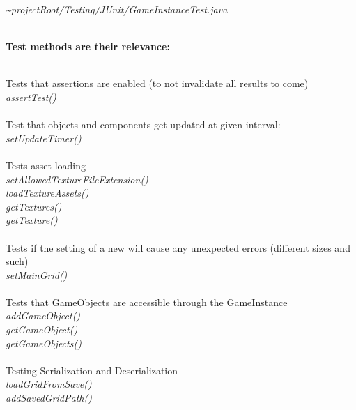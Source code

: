 \documentclass[]{article}
\begin{document}
\emph{\textasciitilde{}projectRoot/Testing/JUnit/GameInstanceTest.java}
\\ \\
\begin{large}
\textbf{Test methods are their relevance:}
\end{large}
\\
Tests that assertions are enabled (to not invalidate all results to come)\\
\hspace*{10mm} \emph{assertTest()}
\\ \\
Test that objects and components get updated at given interval:\\
\hspace*{10mm} \emph{setUpdateTimer()}
\\ \\
Tests asset loading \\
\hspace*{10mm} \emph{setAllowedTextureFileExtension()}\\
\hspace*{10mm} \emph{loadTextureAssets()}\\
\hspace*{10mm} \emph{getTextures()}\\
\hspace*{10mm} \emph{getTexture()}
\\ \\
Tests if the setting of a new will cause any unexpected errors (different sizes and such)\\
\hspace*{10mm} \emph{setMainGrid()}
\\ \\
Tests that GameObjects are accessible through the GameInstance\\
\hspace*{10mm} \emph{addGameObject()}\\
\hspace*{10mm} \emph{getGameObject()}\\
\hspace*{10mm} \emph{getGameObjects()}
\\ \\
Testing Serialization and Deserialization\\
\hspace*{10mm} \emph{loadGridFromSave()}\\
\hspace*{10mm} \emph{addSavedGridPath()}\\
\end{document}
